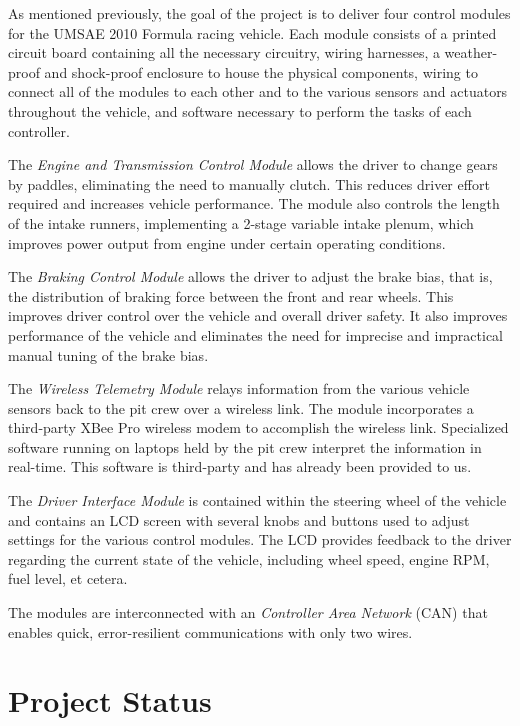 \documentclass[12pt]{report}
\begin{document}
As mentioned previously, the goal of the project is to deliver four control modules for the UMSAE 2010 Formula racing vehicle. Each module consists of a printed circuit board containing all the necessary circuitry, wiring harnesses, a weather-proof and shock-proof enclosure to house the physical components, wiring to connect all of the modules to each other and to the various sensors and actuators throughout the vehicle, and software necessary to perform the tasks of each controller.

The \emph{Engine and Transmission Control Module} allows the driver to change gears by paddles, eliminating the need to manually clutch. This reduces driver effort required and increases vehicle performance. The module also controls the length of the intake runners, implementing a 2-stage variable intake plenum, which improves power output from engine under certain operating conditions.

The \emph{Braking Control Module} allows the driver to adjust the brake bias, that is, the distribution of braking force between the front and rear wheels. This improves driver control over the vehicle and overall driver safety. It also improves performance of the vehicle and eliminates the need for imprecise and impractical manual tuning of the brake bias.

The \emph{Wireless Telemetry Module} relays information from the various vehicle sensors back to the pit crew over a wireless link. The module incorporates a third-party XBee Pro wireless modem to accomplish the wireless link. Specialized software running on laptops held by the pit crew interpret the information in real-time. This software is third-party and has already been provided to us.

The \emph{Driver Interface Module} is contained within the steering wheel of the vehicle and contains an LCD screen with several knobs and buttons used to adjust settings for the various control modules. The LCD provides feedback to the driver regarding the current state of the vehicle, including wheel speed, engine RPM, fuel level, et cetera. 

The modules are interconnected with an \emph{Controller Area Network} (CAN) that enables quick, error-resilient communications with only two wires.

\pagebreak

\section{Project Status}
\end{document}

